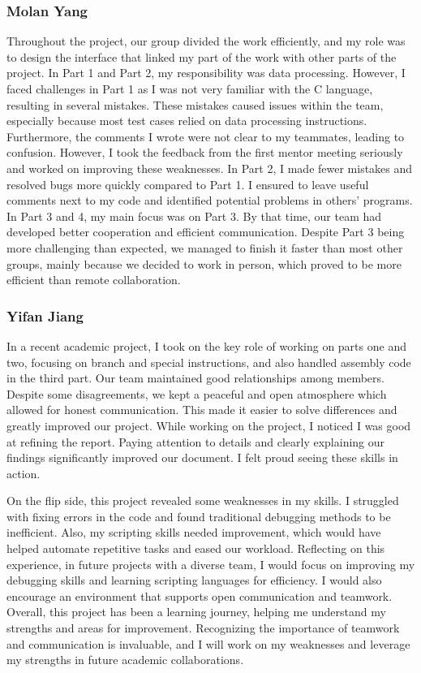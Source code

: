 \documentclass[11pt]{article}
\begin{document}
\subsubsection{Molan Yang}
Throughout the project, our group divided the work efficiently, and my role was to design the interface that linked my part of the work with other parts of the project. In Part 1 and Part 2, my responsibility was data processing. However, I faced challenges in Part 1 as I was not very familiar with the C language, resulting in several mistakes. These mistakes caused issues within the team, especially because most test cases relied on data processing instructions. Furthermore, the comments I wrote were not clear to my teammates, leading to confusion. However, I took the feedback from the first mentor meeting seriously and worked on improving these weaknesses. In Part 2, I made fewer mistakes and resolved bugs more quickly compared to Part 1. I ensured to leave useful comments next to my code and identified potential problems in others' programs. In Part 3 and 4, my main focus was on Part 3. By that time, our team had developed better cooperation and efficient communication. Despite Part 3 being more challenging than expected, we managed to finish it faster than most other groups, mainly because we decided to work in person, which proved to be more efficient than remote collaboration.

\subsubsection{Yifan Jiang}
In a recent academic project, I took on the key role of working on parts one and two, focusing on branch and special instructions, and also handled assembly code in the third part. Our team maintained good relationships among members. Despite some disagreements, we kept a peaceful and open atmosphere which allowed for honest communication. This made it easier to solve differences and greatly improved our project. While working on the project, I noticed I was good at refining the report. Paying attention to details and clearly explaining our findings significantly improved our document. I felt proud seeing these skills in action.

On the flip side, this project revealed some weaknesses in my skills. I struggled with fixing errors in the code and found traditional debugging methods to be inefficient. Also, my scripting skills needed improvement, which would have helped automate repetitive tasks and eased our workload. Reflecting on this experience, in future projects with a diverse team, I would focus on improving my debugging skills and learning scripting languages for efficiency. I would also encourage an environment that supports open communication and teamwork. Overall, this project has been a learning journey, helping me understand my strengths and areas for improvement. Recognizing the importance of teamwork and communication is invaluable, and I will work on my weaknesses and leverage my strengths in future academic collaborations.
\end{document}
